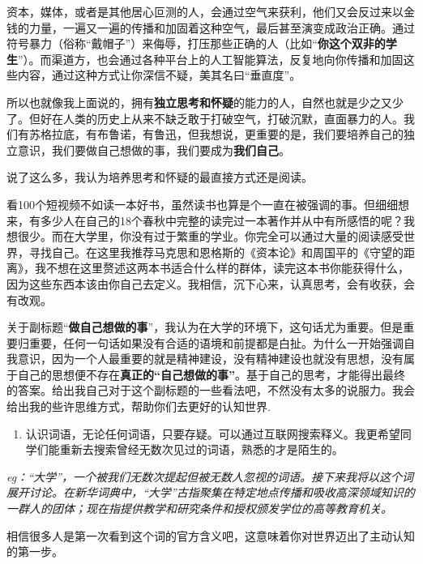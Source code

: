 \documentclass{beamer}	%
\theoremstyle{plain}
\theoremstyle{definition}
\theoremstyle{remark}
\numberwithin{equation}{section}
\begin{document}
\begin{frame}
	资本，媒体，或者是其他居心叵测的人，会通过空气来获利，他们又会反过来以金钱的力量，一遍又一遍的传播和加固着这种空气，最后甚至演变成政治正确。通过符号暴力（俗称“戴帽子”）来侮辱，打压那些正确的人（比如“\textbf{你这个双非的学生}”）。而渠道方，也会通过各种平台上的人工智能算法，反复地向你传播和加固这些内容，通过这种方式让你深信不疑，美其名曰“垂直度”。
	\vspace{0.5cm}

	所以也就像我上面说的，拥有\textbf{独立思考和怀疑}的能力的人，自然也就是少之又少了。但好在人类的历史上从来不缺乏敢于打破空气，打破沉默，直面暴力的人。我们有苏格拉底，有布鲁诺，有鲁迅，但我想说，更重要的是，我们要培养自己的独立意识，我们要做自己想做的事，我们要成为\textbf{我们自己}。
\end{frame}

\begin{frame}
	说了这么多，我认为培养思考和怀疑的最直接方式还是阅读。
	\vspace{0.5cm}

	看100个短视频不如读一本好书，虽然读书也算是个一直在被强调的事。但细细想来，有多少人在自己的18个春秋中完整的读完过一本著作并从中有所感悟的呢？我想很少。而在大学里，你没有过于繁重的学业。你完全可以通过大量的阅读感受世界，寻找自己。在这里我推荐马克思和恩格斯的《资本论》和周国平的《守望的距离》，我不想在这里赘述这两本书适合什么样的群体，读完这本书你能获得什么，因为这些东西本该由你自己去定义。我相信，沉下心来，认真思考，会有收获，会有改观。
\end{frame}

\begin{frame}
	关于副标题“\textbf{做自己想做的事}”，我认为在大学的环境下，这句话尤为重要。但是重要归重要，任何一句话如果没有合适的语境和前提都是白扯。为什么一开始强调自我意识，因为一个人最重要的就是精神建设，没有精神建设也就没有思想，没有属于自己的思想便不存在\textbf{真正的“自己想做的事”}。基于自己的思考，才能得出最终的答案。给出我自己对于这个副标题的一些看法吧，不然没有太多的说服力。我会给出我的些许思维方式，帮助你们去更好的认知世界.
\end{frame}

\begin{frame}
	\begin{enumerate}[1]
		\item 认识词语，无论任何词语，只要存疑。可以通过互联网搜索释义。我更希望同学们能重新去搜索曾经无数次见过的词语，熟悉的才是陌生的。
	\end{enumerate}
	\vspace{1cm}

	\textit{eg：“大学”，一个被我们无数次提起但被无数人忽视的词语。接下来我将以这个词展开讨论。在新华词典中，“大学”古指聚集在特定地点传播和吸收高深领域知识的一群人的团体；现在指提供教学和研究条件和授权颁发学位的高等教育机关。}
	\vspace{0.5cm}

	相信很多人是第一次看到这个词的官方含义吧，这意味着你对世界迈出了主动认知的第一步。
\end{frame}
\end{document}
